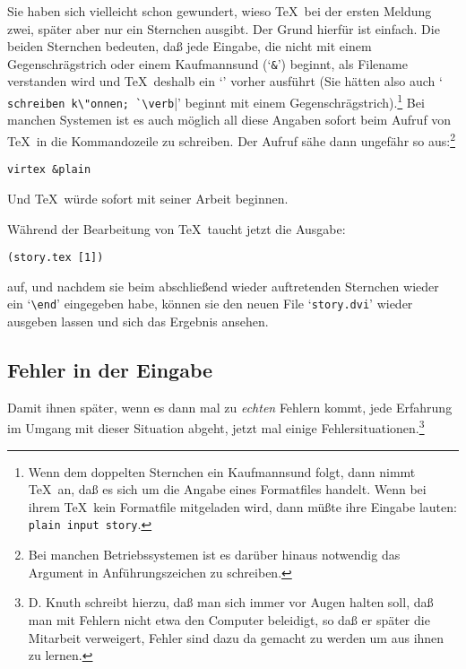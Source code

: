 Sie haben sich vielleicht schon gewundert, wieso \TeX\ bei der ersten
Meldung zwei, sp\"ater aber nur ein Sternchen ausgibt. Der Grund hierf\"ur
ist einfach. Die beiden Sternchen bedeuten, da\ss{} jede Eingabe, die
nicht mit einem 
Gegenschr\"agstrich oder einem Kaufmannsund (`\verb|&|')
beginnt, als Filename verstanden wird und \TeX\ deshalb ein
 `\verb||' vorher ausf\"uhrt (Sie
h\"atten also auch `\verb| schreiben k\"onnen; `\verb||'
beginnt mit einem 
Gegenschr\"agstrich).\footnote{Wenn dem doppelten
Sternchen ein
Kaufmannsund folgt, dann nimmt \TeX\ an, da\ss{} es sich um die Angabe
eines Formatfiles handelt. Wenn bei ihrem \TeX\ kein Formatfile
mitgeladen wird, dann m\"u\ss{}te ihre Eingabe lauten: {\tt{} plain
 input story}.} Bei manchen Systemen ist es auch m\"oglich all
diese Angaben sofort beim Aufruf von \TeX\ in die Kommandozeile zu
schreiben. Der Aufruf s\"ahe dann ungef\"ahr so aus:\footnote{Bei manchen
Betriebssystemen ist es dar\"uber hinaus notwendig das Argument in
Anf\"uhrungszeichen zu schreiben.}
\begin{verbatim}
virtex &plain 
\end{verbatim}
Und \TeX\ w\"urde sofort mit seiner Arbeit beginnen.

W\"ahrend der Bearbeitung von \TeX\ taucht jetzt die Ausgabe:
\begin{verbatim}
(story.tex [1])
\end{verbatim}
auf, und nachdem sie beim abschlie\ss{}end wieder auftretenden Sternchen
wieder ein `\verb|\end|' eingegeben habe, k\"onnen sie den
neuen File
`\verb|story.dvi|' wieder ausgeben lassen und sich das Ergebnis
ansehen.
\subsection{Fehler in der Eingabe}
Damit ihnen sp\"ater, wenn es dann mal zu {\em echten} Fehlern kommt,
jede Erfahrung im Umgang mit dieser Situation abgeht, jetzt mal einige
Fehlersituationen.\footnote{
D. Knuth schreibt hierzu, da\ss{} man sich
immer vor Augen halten soll, da\ss{} man mit Fehlern nicht etwa den
Computer beleidigt, so da\ss{} er sp\"ater die Mitarbeit verweigert, Fehler
sind dazu da gemacht zu werden um aus ihnen zu lernen.}
